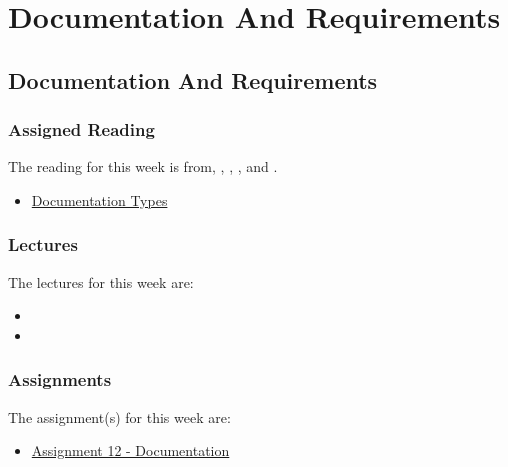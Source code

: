 \clearpage

\renewcommand{\ChapTitle}{Documentation And Requirements}
\renewcommand{\SectionTitle}{Documentation And Requirements}

\chapter{\ChapTitle}

\section{\SectionTitle}

\subsection{Assigned Reading}

The reading for this week is from, \AgileBook, \EngSoftBook, \ProGitBook, and \LinuxBook.

\begin{itemize}
    \item \href{https://helpjuice.com/blog/software-documentation}{Documentation Types}
\end{itemize}

\subsection{Lectures}

The lectures for this week are:

\begin{itemize}
    \item {}
    \item {}
\end{itemize}

\subsection{Assignments}

The assignment(s) for this week are:

\begin{itemize}
    \item \href{https://github.com/QuantumCompiler/CU/tree/main/CSPB%203308%20-%20Software%20Development%20Methods%20And%20Tools/Assignments/Assignment%2012%20-%20Documentation}{Assignment 12 - Documentation}
\end{itemize}

